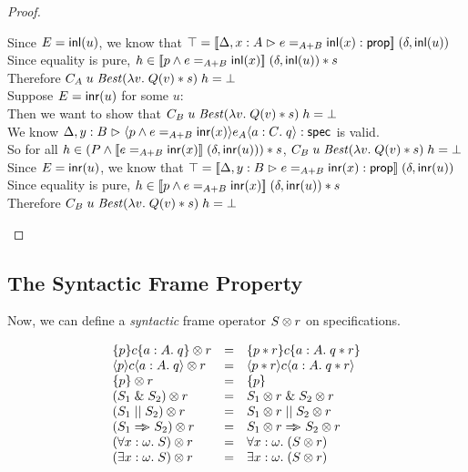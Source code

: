 \begin{proof}
\begin{tabbedproof}
\ooooo Since $E=\inl(u)$, we know that $\top = \interp{\judgeA[\Delta,x:A]{e=_{A+B}\inl(x)}{\assert}}\;(\delta,\inl(u))$\\
\ooooo Since equality is pure, $h \in \interp{p \land e =_{A+B} \inl(x)}\;(\delta,\inl(u)) * s$ \\
\ooooo Therefore $C_A\;u\;\mathit{Best}(\semfun{v}{Q(v)*s})\;h = \bot$\\
\oooo Suppose $E = \inr(u)$ for some $u$:  \\
\ooooo Then we want to show that $C_B\;u\;\mathit{Best}(\semfun{v}{Q(v)*s})\;h = \bot$\\
\ooooo We know $\judgeS[\Delta,y:B]{\mspec{p \land e =_{A+B} \inr(x)}{e_A}{a:C}{q}}$ is valid. \\
\ooooo So for all $h \in (P \land \interp{e =_{A+B} \inr(x)}\;(\delta,\inr(u))) * s$, $C_B\;u\;\mathit{Best}(\semfun{v}{Q(v)*s})\;h = \bot$\\
\ooooo Since $E=\inr(u)$, we know that $\top = \interp{\judgeA[\Delta,y:B]{e=_{A+B}\inr(x)}{\assert}}\;(\delta,\inr(u))$\\
\ooooo Since equality is pure, $h \in \interp{p \land e =_{A+B} \inr(x)}\;(\delta,\inr(u)) * s$ \\
\ooooo Therefore $C_B\;u\;\mathit{Best}(\semfun{v}{Q(v)*s})\;h = \bot$\\

\end{tabbedproof}
\end{proof}

\subsection{The Syntactic Frame Property}

Now, we can define a \emph{syntactic} frame operator $\Frame{S}{r}$
on specifications. 

\begin{displaymath}
  \begin{array}{lcl}
    \Frame{\spec{p}{c}{a:A}{q}}{r}    & = & \spec{p * r}{c}{a:A}{q * r} \\
    \Frame{\mspec{p}{c}{a:A}{q}}{r}   & = & \mspec{p * r}{c}{a:A}{q * r} \\
    \Frame{\setof{p}}{r}              & = & \setof{p} \\
    \Frame{(S_1 \specand S_2)}{r}      & = & \Frame{S_1}{r} \specand \Frame{S_2}{r} \\
    \Frame{(S_1 \specor S_2)}{r}       & = & \Frame{S_1}{r} \specor \Frame{S_2}{r} \\
    \Frame{(S_1 \specimp S_2)}{r}      & = & \Frame{S_1}{r} \specimp \Frame{S_2}{r} \\
    \Frame{(\forall x:\omega.\; S)}{r} & = & \forall x:\omega.\; (\Frame{S}{r}) \\
    \Frame{(\exists x:\omega.\; S)}{r} & = & \exists x:\omega.\; (\Frame{S}{r}) \\
  \end{array}
\end{displaymath}


